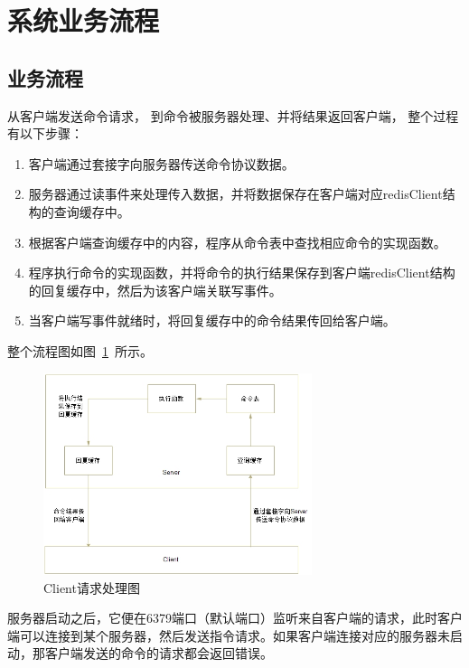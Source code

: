 \documentclass{zjutthesis}
\begin{document}
\section{系统业务流程}
\subsection{业务流程}
从客户端发送命令请求， 到命令被服务器处理、并将结果返回客户端， 整个过程有以下步骤：
\begin{enumerate}[label=（\arabic*）]
\item{客户端通过套接字向服务器传送命令协议数据。}
\item{服务器通过读事件来处理传入数据，并将数据保存在客户端对应redisClient结构的查询缓存中。}
\item{根据客户端查询缓存中的内容，程序从命令表中查找相应命令的实现函数。}
\item{程序执行命令的实现函数，并将命令的执行结果保存到客户端redisClient结构的回复缓存中，然后为该客户端关联写事件。}
\item{当客户端写事件就绪时，将回复缓存中的命令结果传回给客户端。}
\end{enumerate}

整个流程图如图~\ref{fig:Flow-Chart}~所示。
\begin{figure}[H]
\centering
\includegraphics[width=0.7\textwidth]{Flow-Chart}
\caption{Client请求处理图}\label{fig:Flow-Chart}
\vspace{\baselineskip} %
\end{figure}


服务器启动之后，它便在6379端口（默认端口）监听来自客户端的请求，此时客户端可以连接到某个服务器，然后发送指令请求。如果客户端连接对应的服务器未启动，那客户端发送的命令的请求都会返回错误。
\end{document}
